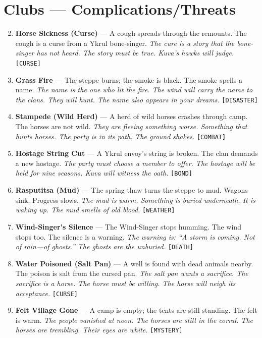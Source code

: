 \section*{Clubs --- Complications/Threats}
\label{sec:kuvani-complications}
\begin{enumerate}
\setcounter{enumi}{1}
\item \textbf{Horse Sickness (Curse)} --- A cough spreads through the remounts. The cough is a curse from a Ykrul bone-singer.
  \hfill \textit{The cure is a story that the bone-singer has not heard. The story must be true. Kuva's hawks will judge.} \texttt{[CURSE]}
\item \textbf{Grass Fire} --- The steppe burns; the smoke is black. The smoke spells a name.
  \hfill \textit{The name is the one who lit the fire. The wind will carry the name to the clans. They will hunt. The name also appears in your dreams.} \texttt{[DISASTER]}
\item \textbf{Stampede (Wild Herd)} --- A herd of wild horses crashes through camp. The horses are not wild.
  \hfill \textit{They are fleeing something worse. Something that hunts horses. The party is in its path. The ground shakes.} \texttt{[COMBAT]}
\item \textbf{Hostage String Cut} --- A Ykrul envoy's string is broken. The clan demands a new hostage.
  \hfill \textit{The party must choose a member to offer. The hostage will be held for nine seasons. Kuva will witness the oath.} \texttt{[BOND]}
\item \textbf{Rasputitsa (Mud)} --- The spring thaw turns the steppe to mud. Wagons sink. Progress slows.
  \hfill \textit{The mud is warm. Something is buried underneath. It is waking up. The mud smells of old blood.} \texttt{[WEATHER]}
\item \textbf{Wind-Singer's Silence} --- The Wind-Singer stops humming. The wind stops too. The silence is a warning.
  \hfill \textit{The warning is: ``A storm is coming. Not of rain---of ghosts.'' The ghosts are the unburied.} \texttt{[DEATH]}
\item \textbf{Water Poisoned (Salt Pan)} --- A well is found with dead animals nearby. The poison is salt from the cursed pan.
  \hfill \textit{The salt pan wants a sacrifice. The sacrifice is a horse. The horse must be willing. The horse will neigh its acceptance.} \texttt{[CURSE]}
\item \textbf{Felt Village Gone} --- A camp is empty; the tents are still standing. The felt is warm.
  \hfill \textit{The people vanished at noon. The horses are still in the corral. The horses are trembling. Their eyes are white.} \texttt{[MYSTERY]}

\end{enumerate}

